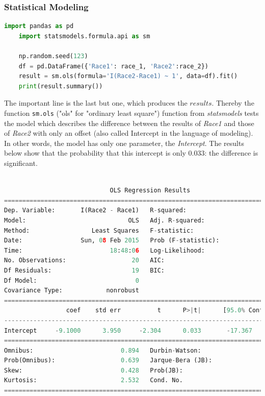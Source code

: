 \subsubsection{Statistical Modeling}

\begin{lstlisting}[language=Python]
    import pandas as pd
    import statsmodels.formula.api as sm

    np.random.seed(123)
    df = pd.DataFrame({'Race1': race_1, 'Race2':race_2})
    result = sm.ols(formula='I(Race2-Race1) ~ 1', data=df).fit()
    print(result.summary())
\end{lstlisting}

The important line is the last but one, which produces the $results$. Thereby the function \lstinline{sm.ols}  ("ols" for "ordinary least square") function from \emph{statsmodels} tests the model which describes the difference between the results of \emph{Race1} and those of \emph{Race2} with only an offset (also called Intercept in the language of modeling). In other words, the model has only one parameter, the \emph{Intercept}. The results below show that the probability that this intercept is only $0.033$: the difference is significant.

 \small\begin{lstlisting}[language=Python]

                             OLS Regression Results
==============================================================================
Dep. Variable:       I(Race2 - Race1)   R-squared:                       0.000
Model:                            OLS   Adj. R-squared:                  0.000
Method:                 Least Squares   F-statistic:                       nan
Date:                Sun, 08 Feb 2015   Prob (F-statistic):                nan
Time:                        18:48:06   Log-Likelihood:                -85.296
No. Observations:                  20   AIC:                             172.6
Df Residuals:                      19   BIC:                             173.6
Df Model:                           0
Covariance Type:            nonrobust
==============================================================================
                 coef    std err          t      P>|t|      [95.0% Conf. Int.]
------------------------------------------------------------------------------
Intercept     -9.1000      3.950     -2.304      0.033       -17.367    -0.833
==============================================================================
Omnibus:                        0.894   Durbin-Watson:                   2.009
Prob(Omnibus):                  0.639   Jarque-Bera (JB):                0.793
Skew:                           0.428   Prob(JB):                        0.673
Kurtosis:                       2.532   Cond. No.                         1.00
==============================================================================
\end{lstlisting}
\normalsize

